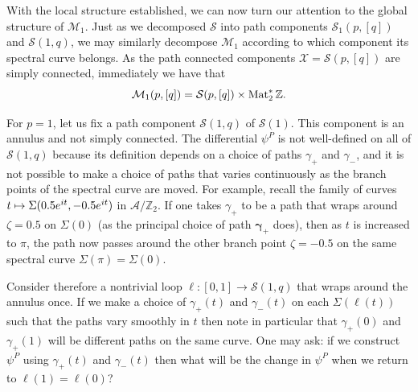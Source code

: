\documentclass{article}
\begin{document}
With the local structure established, we can now turn our attention to the global structure of $\mathcal{M}_1$. Just as we decomposed $\mathcal{S}$ into path components $\mathcal{S_1}(p,[q])$ and $\mathcal{S}(1,q)$, we may similarly decompose $\mathcal{M}_1$ according to which component its spectral curve belongs. As the path connected components $\mathcal{X} = \mathcal{S}(p,[q])$ are simply connected, immediately we have that
\[
\mathcal{M}_1(p, [q]) = \mathcal{S}(p,[q]) \times \operatorname{Mat}_2^*\mathbb{Z}.
\]

For $p=1$, let us fix a path component $\mathcal{S}(1,q)$ of $\mathcal{S}(1)$.
This component is an annulus and not simply connected. The differential $\psi^P$ is not well-defined on all of $\mathcal{S}(1,q)$ because its definition depends on a choice of paths $\gamma_+$ and $\gamma_-$, and it is not possible to make a choice of paths that varies continuously as the branch points of the spectral curve are moved. For example, recall the family of curves $t \mapsto \Sigma(0.5 e^{i t}, -0.5 e^{i t})$ in $\mathcal{A}/\mathbb{Z}_2$. If one takes $\gamma_+$ to be a path that wraps around $\zeta = 0.5$ on $\Sigma(0)$ (as the principal choice of path $\boldsymbol{\gamma}_+$ does), then as $t$ is increased to $\pi$, the path now passes around the other branch point $\zeta=-0.5$ on the same spectral curve $\Sigma(\pi) = \Sigma(0)$.

Consider therefore a nontrivial loop $\ell : [0,1] \to \mathcal{S}(1,q)$ that wraps around the annulus once. If we make a choice of $\gamma_+(t)$ and $\gamma_-(t)$ on each $\Sigma(\ell(t))$ such that the paths vary smoothly in $t$ then note in particular that $\gamma_+(0)$ and $\gamma_+(1)$ will be different paths on the same curve. One may ask: if we construct $\psi^P$ using $\gamma_+(t)$ and $\gamma_-(t)$ then what will be the change in $\psi^P$ when we return to $\ell(1) = \ell(0)$?
\end{document}
